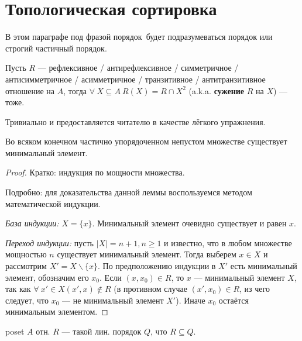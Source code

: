 \section{Топологическая сортировка}\label{sec:ch-2-sec-5}

В этом параграфе под фразой  порядок\guillemotright ~будет подразумеваться  порядок или строгий частичный порядок\guillemotright.

\begin{lemma}
    Пусть $R$ — рефлексивное / антирефлексивное / симметричное / антисимметричное / асимметричное / транзитивное / антитранзитивное отношение на $A$, тогда $\forall ~X \subseteq A ~R(X)=R\cap X^2$ (a.k.a. \textbf{сужение} $R$ на $X$) — тоже.
\end{lemma}

\begin{sh-proof}
    Тривиально и предоставляется читателю в качестве лёгкого упражнения.
\end{sh-proof}

\begin{lemma}
    Во всяком конечном частично упорядоченном непустом множестве существует минимальный элемент.
\end{lemma}

\begin{proof}
    Кратко: индукция по мощности множества.

    Подробно: для доказательства данной леммы воспользуемся методом математической индукции.

    \textit{База индукции:} $X = \{x\}$. Минимальный элемент очевидно существует и равен $x$.

    \textit{Переход индукции:} пусть $|X| = n + 1, n \geq 1$ и известно, что в любом множестве мощностью $n$ существует минимальный элемент. Тогда выберем $x \in X$ и рассмотрим $X' = X \backslash \{x\}$. По предположению индукции в $X'$ есть минимальный элемент, обозначим его $x_0$. Если $(x, x_0) \in R$, то $x$ — минимальный элемент $X$, так как $\forall ~x' \in X (x', x) \notin R$ (в противном случае $(x', x_0) \in R$, из чего следует, что $x_0$ — не минимальный элемент $X'$). Иначе $x_0$ остаётся минимальным элементом.
\end{proof}

\begin{sh-definition} 
    poset $A$ отн. $R$ — такой лин. порядок $Q$, что $R \subseteq Q$.
\end{sh-definition}

